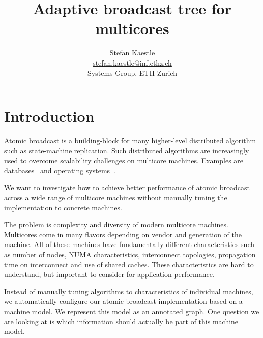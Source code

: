\documentclass{article}
\begin{document}
\title{Adaptive broadcast tree for multicores}

\newcommand{\eaddr}{stefan.kaestle@inf.ethz.ch}
\newcommand{\email}{\href{mailto:\eaddr}{\eaddr}}

\author{Stefan Kaestle\\
  \email \\
  Systems Group, ETH Zurich}

\maketitle


\section{Introduction}

Atomic broadcast is a building-block for many higher-level distributed
algorithm such as state-machine replication. Such distributed
algorithms are increasingly used to overcome scalability challenges on
multicore machines. Examples are databases~\cite{Salomie2011,
  Wiesmann2000} and operating systems~\cite{fos:osr09, tornado:osdi99,
  barrelfish:sosp09}.

We want to investigate how to achieve better performance of atomic
broadcast across a wide range of multicore machines without manually
tuning the implementation to concrete machines.

The problem is complexity and diversity of modern multicore
machines. Multicores come in many flavors depending on vendor and
generation of the machine. All of these machines have fundamentally
different characteristics such as number of nodes, NUMA
characteristics, interconnect topologies, propagation time on
interconnect and use of shared caches. These characteristics are hard
to understand, but important to consider for application performance. 

Instead of manually tuning algorithms to characteristics of individual
machines, we automatically configure our atomic broadcast
implementation based on a machine model. We represent this model as an
annotated graph. One question we are looking at is which information
should actually be part of this machine model.
\end{document}
